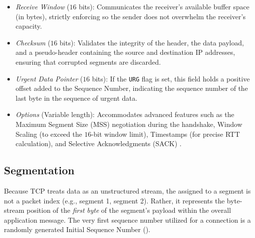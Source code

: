 \begin{itemize}
\begin{itemize}
        \item \texttt{ACK} (Acknowledgment, \( 1 \) bit): Indicates that the Acknowledgment Number field is valid. All segments after the initial \texttt{SYN} packet must have this flag set.
        \item \texttt{PSH} (Push, \( 1 \) bit): Instructs the receiving host to immediately push all buffered data to the receiving application without waiting for the buffer to fill.
        \item \texttt{RST} (Reset, \( 1 \) bit): Immediately aborts the connection, usually in response to an unrecoverable error or an invalid segment.
        \item \texttt{SYN} (Synchronize, \( 1 \) bit): Used exclusively during the three-way handshake to synchronize sequence numbers and initiate a connection.
        \item \texttt{FIN} (Finish, \( 1 \) bit): Indicates that the sender has no more data to transmit, initiating a graceful connection teardown.
    \end{itemize}
    \item \emph{Receive Window} (\( 16 \) bits): Communicates the receiver's available buffer space (in bytes), strictly enforcing  so the sender does not overwhelm the receiver's capacity.
    \item \emph{Checksum} (\( 16 \) bits): Validates the integrity of the header, the data payload, and a pseudo-header containing the source and destination IP addresses, ensuring that corrupted segments are discarded.
    \item \emph{Urgent Data Pointer} (\( 16 \) bits): If the \texttt{URG} flag is set, this field holds a positive offset added to the Sequence Number, indicating the sequence number of the last byte in the sequence of urgent data.
    \item \emph{Options} (Variable length): Accommodates advanced features such as the Maximum Segment Size (MSS) negotiation during the handshake, Window Scaling (to exceed the \( 16 \)-bit window limit), Timestamps (for precise RTT calculation), and Selective Acknowledgments (SACK) \cite{rfc9293}.
\end{itemize}

\subsection{Segmentation}
Because TCP treats data as an unstructured stream, the  assigned to a segment is not a packet index (e.g., segment 1, segment 2). Rather, it represents the byte-stream position of the \emph{first byte} of the segment's payload within the overall application message. The very first sequence number utilized for a connection is a randomly generated Initial Sequence Number ().

